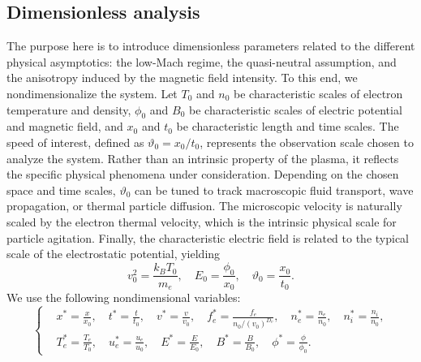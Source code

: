 \documentclass[pdflatex,final,10pt]{article}
\newcommand{\Fabrice}[1]{#1}
\begin{document}
\subsection{Dimensionless analysis}
\Fabrice{The purpose here is to introduce dimensionless parameters related to the different physical asymptotics: the low-Mach regime, the quasi-neutral assumption, and the anisotropy induced by the magnetic field intensity. To this end, we nondimensionalize the system.} Let $T_0$ and $n_0$ be characteristic scales of electron temperature and density, $\phi_0$ and $B_0$ be characteristic scales of electric potential and magnetic field, and $x_0$ and $t_0$ be characteristic length and time scales. \Fabrice{The speed of interest, defined as $\vartheta_0 = x_0 / t_0$, represents the observation scale chosen to analyze the system. Rather than an intrinsic property of the plasma, it reflects the specific physical phenomena under consideration. Depending on the chosen space and time scales, $\vartheta_0$ can be tuned to track macroscopic fluid transport, wave propagation, or thermal particle diffusion. The microscopic velocity is naturally scaled by the electron thermal velocity, which is the intrinsic physical scale for particle agitation. Finally, the characteristic electric field is related to the typical scale of the electrostatic potential, yielding}
\begin{equation*}
    v_0^2=\frac{k_BT_0}{m_e},\quad E_0=\frac{\phi_0}{x_0},\quad \vartheta_0=\frac{x_0}{t_0}.
\end{equation*}
We use the following nondimensional variables:
\begin{equation} \label{2}
    \left\{
    \begin{aligned}
        &x^{*}=\frac{x}{x_0},\quad t^{*}=\frac{t}{t_0},\quad v^{*}=\frac{v}{v_0},\quad f_e^{*}=\frac{f_e}{n_0/(v_0)^{D_v}},\quad n_e^{*}=\frac{n_e}{n_0},\quad n_{i}^{*}=\frac{n_{i}}{n_{0}},\\
        &T_e^*=\frac{T_e}{T_0},\quad {u_e^*=\frac{u_e}{u_0}}, \quad E^{*}=\frac{E}{E_0},\quad B^{*}=\frac{B}{B_0},\quad \phi^{*}=\frac{\phi}{\phi_{0}}.
    \end{aligned}
    \right.
\end{equation}
\end{document}
